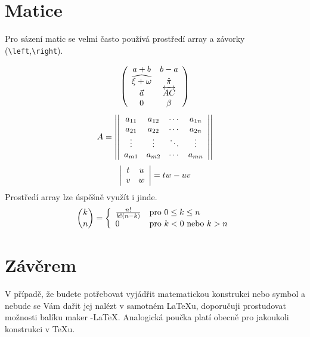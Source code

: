 \documentclass[11pt,twocolumn, a4paper]{article}
\theoremstyle{definition}
\begin{document}
\section{Matice}
%
Pro sázení matic se velmi často používá prostředí {\ttfamily array} a závorky ({\ttfamily \verb|\left|,\verb|\right|}). \par
%
$$ \left(
\begin{array}{c c}
a+b & b-a \\
\widehat{\xi + \omega} & \hat{\pi}\\
\vec{a} & \overleftrightarrow{AC}\\
0 & \beta\\
\end{array} \right)$$
%
$$A= \left| \left|
\begin{array}{c c c c} 
a_{11} & a_{12} & \cdots & a_{1n}\\
a_{21} & a_{22} & \cdots & a_{2n}\\
\vdots  & \vdots  & \ddots & \vdots\\
a_{m1} & a_{m2} & \cdots & a_{mn}\\
\end{array} \right| \right|$$
%
$$ \left| \begin{array}{c c}
t & u\\
v & w\\
\end{array} \right| = tw - uv$$
%
Prostředí {\ttfamily array} lze úspěšně využít i jinde.
%
$$\binom{k}{n} = 
\left\{ \begin{array}{l l}
\frac{n!}{k!(n-k)} & \text{pro } 0 \leq k \leq n \\
0 & \text{pro } k < 0 \text{ nebo } k > n
\end{array} \right. $$\par
%
\section{Závěrem}
V případě, že budete potřebovat vyjádřit matematickou konstrukci nebo symbol a nebude se Vám dařit jej nalézt v samotném \LaTeX u, doporučuji prostudovat možnosti balíku maker \AmS -\LaTeX .
Analogická poučka platí obecně pro jakoukoli konstrukci v \TeX u.
\end{document}
